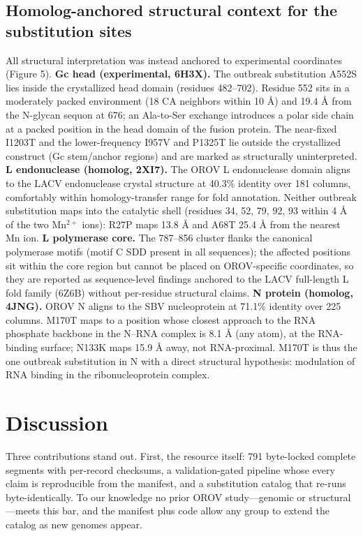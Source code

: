 \documentclass[12pt]{article}
\begin{document}
\subsection{Homolog-anchored structural context for the substitution sites}
All structural interpretation was instead anchored to experimental coordinates (Figure 5).
\textbf{Gc head (experimental, 6H3X).} The outbreak substitution A552S lies inside the crystallized head domain (residues 482--702). Residue 552 sits in a moderately packed environment (18 CA neighbors within 10 \AA{}) and 19.4 \AA{} from the N-glycan sequon at 676; an Ala-to-Ser exchange introduces a polar side chain at a packed position in the head domain of the fusion protein. The near-fixed I1203T and the lower-frequency I957V and P1325T lie outside the crystallized construct (Gc stem/anchor regions) and are marked as structurally uninterpreted.
\textbf{L endonuclease (homolog, 2XI7).} The OROV L endonuclease domain aligns to the LACV endonuclease crystal structure at 40.3\% identity over 181 columns, comfortably within homology-transfer range for fold annotation. Neither outbreak substitution maps into the catalytic shell (residues 34, 52, 79, 92, 93 within 4 \AA{} of the two Mn$^{2+}$ ions): R27P maps 13.8 \AA{} and A68T 25.4 \AA{} from the nearest Mn ion.
\textbf{L polymerase core.} The 787--856 cluster flanks the canonical polymerase motifs (motif C SDD present in all sequences); the affected positions sit within the core region but cannot be placed on OROV-specific coordinates, so they are reported as sequence-level findings anchored to the LACV full-length L fold family (6Z6B) without per-residue structural claims.
\textbf{N protein (homolog, 4JNG).} OROV N aligns to the SBV nucleoprotein at 71.1\% identity over 225 columns. M170T maps to a position whose closest approach to the RNA phosphate backbone in the N--RNA complex is 8.1 \AA{} (any atom), at the RNA-binding surface; N133K maps 15.9 \AA{} away, not RNA-proximal. M170T is thus the one outbreak substitution in N with a direct structural hypothesis: modulation of RNA binding in the ribonucleoprotein complex.

\section{Discussion}
Three contributions stand out. First, the resource itself: 791 byte-locked complete segments with per-record checksums, a validation-gated pipeline whose every claim is reproducible from the manifest, and a substitution catalog that re-runs byte-identically. To our knowledge no prior OROV study---genomic or structural---meets this bar, and the manifest plus code allow any group to extend the catalog as new genomes appear.
\end{document}
